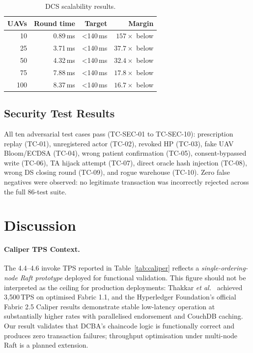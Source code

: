 \documentclass[sigplan,screen]{acmart}
\newcommand{\dcba}{\textsc{DCBA}\xspace}
\newcommand{\etal}{\textit{et al.}\xspace}
\begin{document}
\begin{table}[t]
\caption{DCS scalability results.}
\label{tab:dcs}
\small
\begin{tabular}{@{}rrrr@{}}
\toprule
\textbf{UAVs} & \textbf{Round time} & \textbf{Target} & \textbf{Margin} \\
\midrule
10  & 0.89\,ms & \textless140\,ms & $157\times$ below \\
25  & 3.71\,ms & \textless140\,ms & $37.7\times$ below \\
50  & 4.32\,ms & \textless140\,ms & $32.4\times$ below \\
75  & 7.88\,ms & \textless140\,ms & $17.8\times$ below \\
100 & 8.37\,ms & \textless140\,ms & $16.7\times$ below \\
\bottomrule
\end{tabular}
\end{table}

\subsection{Security Test Results}

All ten adversarial test cases pass (TC-SEC-01 to TC-SEC-10):
prescription replay (TC-01), unregistered actor (TC-02), revoked HP (TC-03),
fake UAV Bloom/ECDSA (TC-04), wrong patient confirmation (TC-05),
consent-bypassed write (TC-06), TA hijack attempt (TC-07),
direct oracle hash injection (TC-08), wrong DS closing round (TC-09),
and rogue warehouse (TC-10).
Zero false negatives were observed: no legitimate transaction was incorrectly
rejected across the full 86-test suite.

\section{Discussion}\label{sec:discussion}

\paragraph{Caliper TPS Context.}
The 4.4--4.6 invoke TPS reported in Table~\ref{tab:caliper} reflects
a \emph{single-ordering-node Raft prototype} deployed for functional
validation.
This figure should not be interpreted as the ceiling for production
deployments: Thakkar \etal~\cite{thakkar2018fabric} achieved 3,500\,TPS on
optimised Fabric 1.1, and the Hyperledger Foundation's official Fabric 2.5
Caliper results demonstrate stable low-latency operation at substantially
higher rates with parallelised endorsement and CouchDB caching.
Our result validates that \dcba's chaincode logic is functionally correct
and produces zero transaction failures; throughput optimisation under
multi-node Raft is a planned extension.
\end{document}
